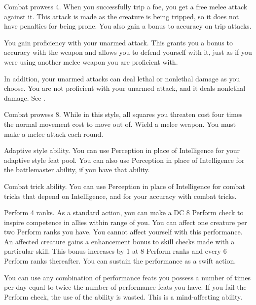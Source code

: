 \featpre Combat prowess 4.
\featben When you successfully trip a foe, you get a free melee attack against it.
This attack is made as the creature is being tripped, so it does not have penalties for being prone.
You also gain a  bonus to accuracy on trip attacks.

\featben You gain proficiency with your unarmed attack.
This grants you a  bonus to accuracy with the weapon and allows you to defend yourself with it, just as if you were using another melee weapon you are proficient with.

In addition, your unarmed attacks can deal lethal or nonlethal damage as you choose.
 You are not proficient with your unarmed attack, and it deals nonlethal damage. See .

\featpre Combat prowess 8.
\featben While in this style, all squares you threaten cost four times the normal movement cost to move out of.
\stylereq Wield a melee weapon.
You must make a melee attack each round.

\featpre Adaptive style ability.
\featben You can use Perception in place of Intelligence for your adaptive style feat pool.
You can also use Perception in place of Intelligence for the battlemaster ability, if you have that ability.

\featpre Combat trick ability.
\featben You can use Perception in place of Intelligence for combat tricks that depend on Intelligence, and for your accuracy with combat tricks.

\featpre Perform 4 ranks.
\featben As a standard action, you can make a DC 8 Perform check to inspire competence in allies within \rngmed range of you.
You can affect one creature per two Perform ranks you have.
You cannot affect yourself with this performance.
An affected creature gains a  enhancement bonus to skill checks made with a particular skill.
This bonus increases by 1 at 8 Perform ranks and every 6 Perform ranks thereafter.
You can sustain the performance as a swift action.

You can use any combination of performance feats you possess a number of times per day equal to twice the number of performance feats you have.
If you fail the Perform check, the use of the ability is wasted.
This is a mind-affecting ability.

